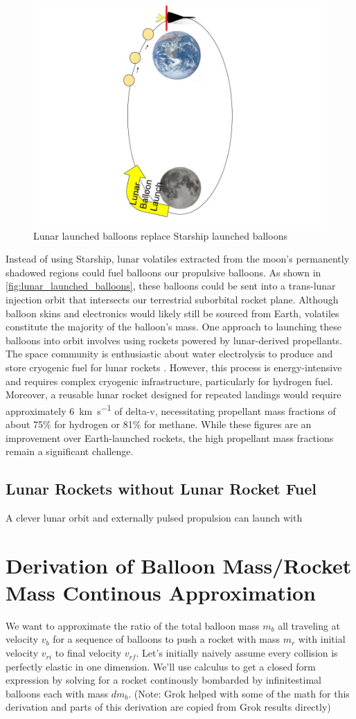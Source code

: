 \documentclass{article}
\begin{document}
{\begin{figure}[htbp]
    \centering
    \includegraphics[width=0.5\linewidth]{images/Water Drawing From Moon.jpg}
    \caption{Lunar launched balloons replace Starship launched balloons \cite{earth_image} \cite{moon_image}}
    \label{fig:lunar_launched_balloons}
\end{figure}
Instead of using Starship, lunar volatiles extracted from the moon's permanently shadowed regions could fuel balloons our propulsive balloons. As shown in \autoref{fig:lunar_launched_balloons}, these balloons could be sent into a trans-lunar injection orbit that intersects our terrestrial suborbital rocket plane. Although balloon skins and electronics would likely still be sourced from Earth, volatiles constitute the majority of the balloon's mass. One approach to launching these balloons into orbit involves using rockets powered by lunar-derived propellants. The space community is enthusiastic about water electrolysis to produce and store cryogenic fuel for lunar rockets \cite{nasa_water}. However, this process is energy-intensive and requires complex cryogenic infrastructure, particularly for hydrogen fuel. Moreover, a reusable lunar rocket designed for repeated landings would require approximately \SI{6}{\km\per\second} of delta-v, necessitating propellant mass fractions of about 75\% for hydrogen or 81\% for methane. While these figures are an improvement over Earth-launched rockets, the high propellant mass fractions remain a significant challenge.   

\subsection{Lunar Rockets without Lunar Rocket Fuel}
A clever lunar orbit and externally pulsed propulsion can launch with 
\appendix 
\section{Derivation of Balloon Mass/Rocket Mass Continous Approximation}\label{sec:balloon_ratio_approximation}  We want to approximate the ratio of the total balloon mass \(m_b\) all traveling at velocity \(v_b\) for a sequence of balloons to push a rocket with mass \(m_r\) with initial velocity \(v_{ri}\) to final velocity \(v_{rf}\).   Let's initially naively assume every collision is perfectly elastic in one dimension.   We'll use calculus to get a  closed form expression by solving for a rocket  continously bombarded by infinitestimal balloons each with mass \(dm_b\).   (Note: Grok \cite{grok}  helped with some of the math for this derivation and parts of this derivation are copied from Grok  results directly)

}
\end{document}
